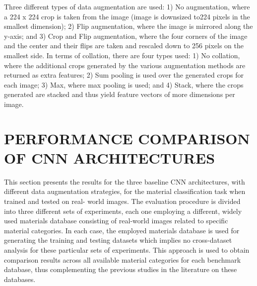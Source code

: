 \documentclass[a4paper,twoside]{article}
\begin{document}
Three different types of data augmentation are used: 1) No augmentation, where a 224 x 224 crop is taken from the image (image is downsized to224 pixels in the smallest dimension); 2) Flip augmentation, where the image is mirrored along the y-axis; and 3) Crop and Flip augmentation, where the four corners of the image and the center and their flips are taken and rescaled down to 256 pixels on the smallest side. In terms of collation, there are four types used: 1) No collation, where the additional crops generated by the various augmentation methods are returned as extra features; 2) Sum pooling is used over the generated crops for each image; 3) Max, where max pooling is used; and 4) Stack, where the crops generated are stacked and thus yield feature vectors of more dimensions per image.

\section{\uppercase{PERFORMANCE COMPARISON OF CNN ARCHITECTURES}}
\noindent This section presents the results for the three baseline CNN architectures, with different data augmentation strategies, for the material classification task when trained and tested on real- world images. The evaluation procedure is divided into three different sets of experiments, each one employing a different, widely used materials database consisting of real-world images related to specific material categories. In each case, the employed materials database is used for generating the training and testing datasets which implies no cross-dataset analysis for these particular sets of experiments. This approach is used to obtain comparison results across all available material categories for each benchmark database, thus complementing the previous studies in the literature on these databases.
\end{document}
